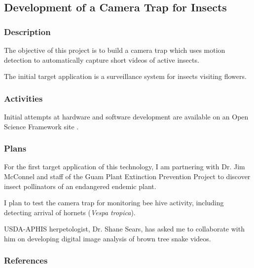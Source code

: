 \begin{comment}
\raggedright\vspace{2mm}\textbf{Activity}
\begin{itemize}
\item Progress on this project blocked by GovGuam beaurocracy. No progress
to report. \newpage{}
\end{itemize}
\end{btUnit}

\begin{btUnit}
\end{comment}


\subsection{Development of a Camera Trap for Insects}
\begin{refsection}
\subsubsection{Description}

The objective of this project is to build a camera trap which uses motion detection to automatically capture short videos of active insects.

The initial target application is a surveillance system for insects visiting flowers.

\subsubsection{Activities}

Initial attempts at hardware and software development are available on an Open Science Framework site \cite{moore_development_2019}.

\subsubsection{Plans}

For the first target application of this technology, I am partnering with Dr. Jim McConnel and staff of the Guam Plant Extinction Prevention Project to discover insect pollinators of an endangered endemic plant.

I plan to test the camera trap for monitoring bee hive activity, including detecting arrival of hornets (\textit{Vespa tropica}).

USDA-APHIS herpetologist, Dr. Shane Sears, has asked me to collaborate with him on developing digital image analysis of brown tree snake videos.

\subsubsection{References}
\printbibliography[heading=none]
\end{refsection}

